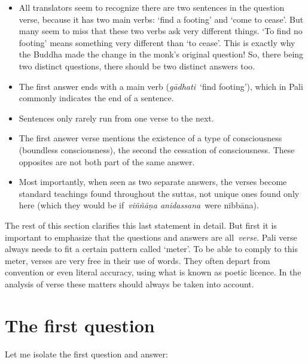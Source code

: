 \documentclass[10pt, openany]{book}
\begin{document}
\begin{itemize}

\itemsep5pt\parskip0pt


\item
All translators seem to recognize there are two sentences in the question verse, because it has two main verbs: ‘find a footing’ and ‘come to cease’. But many seem to miss that these two verbs ask very different things. ‘To find no footing’ means something very different than ‘to cease’. This is exactly why the Buddha made the change in the monk’s original question! So, there being two distinct questions, there should be two distinct answers too.



\item
The first answer ends with a main verb (\textit{gādhati} ‘find footing’), which in Pali commonly indicates the end of a sentence.



\item
Sentences only rarely run from one verse to the next.



\item
The first answer verse mentions the existence of a type of consciousness (boundless consciousness), the second the cessation of consciousness. These opposites are not both part of the same answer.



\item
Most importantly, when seen as two separate answers, the verses become standard teachings found throughout the suttas, not unique ones found only here (which they would be if \textit{viññāṇa anidassana} were nibbāna).





\end{itemize}
The rest of this section clarifies this last statement in detail. But first it is important to emphasize that the questions and answers are all \textit{verse}. Pali verse always needs to fit a certain pattern called ‘meter’. To be able to comply to this meter, verses are very free in their use of words. They often depart from convention or even literal accuracy, using what is known as poetic licence. In the analysis of verse these matters should always be taken into account.




\section{The first question}
Let me isolate the first question and answer:
\end{document}

